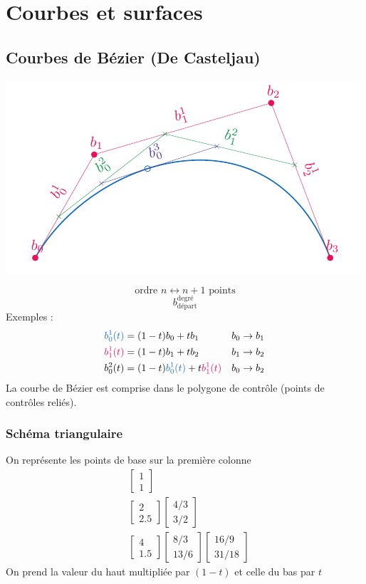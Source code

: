\documentclass[resume]{subfiles}
\begin{document}
    \section{Courbes et surfaces}
    \subsection{Courbes de Bézier (De Casteljau)}
    \begin{center}
	\includegraphics[width=0.8\columnwidth,page=1]{drwg_0.pdf}
	\end{center}
    $$\text{ordre }n \longleftrightarrow n+1\text{ points}$$
	$$\boxed{b_{\text{départ}}^{\text{degré}}}$$
	Exemples :
	\begin{align*}
		\textcolor{RoyalBlue}{b_{0}^{1}(t)}&=(1-t)b_0+tb_1 & b_0\to b_1\\
		\textcolor{OrangeRed}{b_{1}^{1}(t)}&=(1-t)b_1+tb_2 & b_1\to b_2\\
		b_{0}^{2}(t)&=(1-t)\textcolor{RoyalBlue}{b_0^1(t)}+t\textcolor{OrangeRed}{b_1^1(t)} & b_0\to b_2
	\end{align*}
	La courbe de Bézier est comprise dans le polygone de contrôle (points de contrôles reliés).
	\subsubsection{Schéma triangulaire}
On représente les points de base sur la première colonne
\begin{align*}
&\begin{bmatrix}
1\\1
\end{bmatrix}\\
&\begin{bmatrix}
2\\2.5
\end{bmatrix} \begin{bmatrix}
4/3\\3/2
\end{bmatrix}\\
&\begin{bmatrix}
4\\1.5
\end{bmatrix} \begin{bmatrix}
8/3\\13/6
\end{bmatrix} \begin{bmatrix}
16/9\\
31/18
\end{bmatrix}
\end{align*}
On prend la valeur du haut multipliée par $(1-t)$ et celle du bas par $t$
\end{document}
